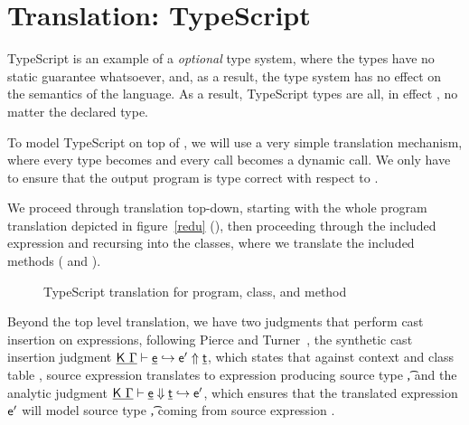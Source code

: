 \documentclass[a4paper,USenglish]{tex/lipics-v2016}
\begin{document}
\section{Translation: TypeScript}

TypeScript is an example of a \emph{optional} type system, where the types have
no static guarantee whatsoever, and, as a result, the type system has no effect
on the semantics of the language. As a result, TypeScript types are all, in
effect \any, no matter the declared type.

To model TypeScript on top of \kafka, we will use a very simple translation 
mechanism, where every type becomes \any and every call becomes a dynamic call.
We only have to ensure that the output program is type correct with respect to
\kafka.

We proceed through translation top-down, starting with the whole program 
translation depicted in figure~\ref{redu} (), then proceeding 
through the included expression and recursing into the classes, where we 
translate the included methods ( and ).

\begin{figure}[!h]
\begin{mathpar}



\end{mathpar}
\caption{TypeScript translation for program, class, and method}
\label{fig:tstrans_cla}
\end{figure}

Beyond the top level translation, we have two judgments that perform cast 
insertion on expressions, following Pierce and Turner~\cite{pierce:1998:local},
the synthetic cast insertion judgment $\GenCast\K\Env\e\ep\t$, which states that
against context \Env and class table \K, source expression \e translates to
\kafka expression \ep producing source type \t, and the analytic judgment
$\AnaCast\K\Env\e\ep\t$, which ensures that the translated \kafka expression 
$\ep$ will model source type \t, coming from source expression \e.
\end{document}
